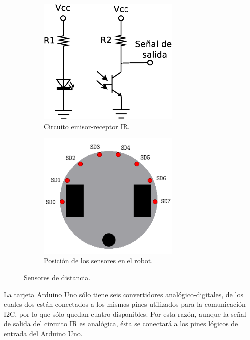 \documentclass[a4paper,12pt]{article}
\begin{document}
\begin{figure}
  \centering
  \begin{subfigure}[b]{0.4\textwidth}
    \centering
    \includegraphics[width=0.75\textwidth]{Figures/Infrarrojo.eps}
    \caption{Circuito emisor-receptor IR.}
    \label{fig:CircuitoIR}
  \end{subfigure}
  \qquad\qquad
  \begin{subfigure}[b]{0.4\textwidth}
    \centering
    \includegraphics[width=0.75\textwidth]{Figures/SensorPoses.png}
    \caption{Posición de los sensores en el robot.}
    \label{fig:SensorPoses}
  \end{subfigure}
\caption{Sensores de distancia.}
\end{figure}

La tarjeta Arduino Uno sólo tiene seis convertidores analógico-digitales, de los cuales dos están conectados a los mismos pines utilizados para la comunicación I2C, por lo que sólo quedan cuatro disponibles. Por esta razón, aunque la señal de salida del circuito IR es analógica, ésta se conectará a los pines lógicos de entrada del Arduino Uno. 
\end{document}
